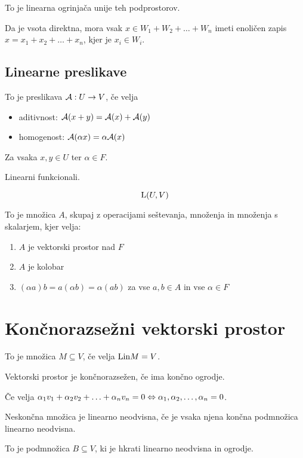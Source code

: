 To je linearna ogrinjača unije teh podprostorov.

Da je vsota direktna, mora vsak $x \in W_1+W_2+\ldots+W_n$ imeti enoličen zapis $x = x_1 + x_2 + \ldots + x_n$, kjer je $x_i \in W_i$.

\subsection{Linearne preslikave}


To je preslikava $\mathcal{A}: U\to V$, če velja
\begin{itemize}
	\item aditivnost: $\mathcal{A} (x+y) = \mathcal{A}(x) + \mathcal{A}(y)$
	\item homogenost: $\mathcal{A}(\alpha x) = \alpha \mathcal{A}(x)$
\end{itemize}

Za vsaka $x,y \in U$ ter $\alpha \in F$.


Linearni funkcionali.


\[
	\text{L}(U, V)
\]


To je množica $A$, skupaj z operacijami seštevanja, množenja in množenja s skalarjem, kjer velja:

\begin{enumerate}
	\item $A$ je vektorski prostor nad $F$
	\item $A$ je kolobar
	\item $(\alpha a)b = a(\alpha b) = \alpha (ab)$ za vse $a,b \in A$ in vse $\alpha \in F$
\end{enumerate}

\section{Končnorazsežni vektorski prostor}


To je množica $M \subseteq V$, če velja $\text{Lin} M = V$.

Vektorski prostor je končnorazsežen, če ima končno ogrodje.


Če velja $\alpha_1 v_1 + \alpha_2 v_2 + \ldots + \alpha_n v_n = 0 \Leftrightarrow {\alpha}_1, {\alpha}_2, \ldots, {\alpha}_n = 0$.

Neskončna množica je linearno neodvisna, če je vsaka njena končna podmnožica linearno neodvisna.


To je podmnožica $B \subseteq V$, ki je hkrati linearno neodvisna in ogrodje.